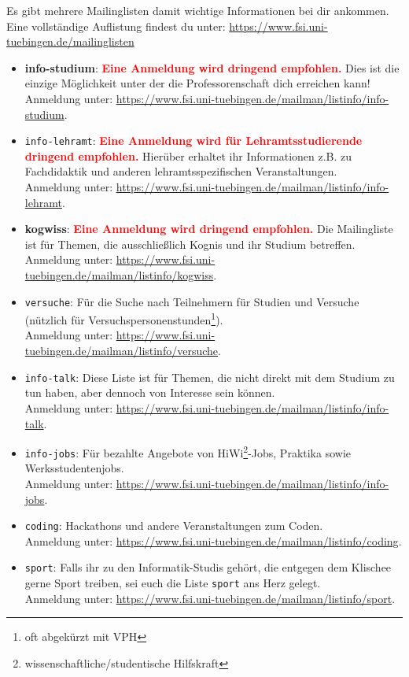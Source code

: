 Es gibt mehrere Mailinglisten damit wichtige Informationen bei dir ankommen.\\
Eine vollständige Auflistung findest du unter: \url{https://www.fsi.uni-tuebingen.de/mailinglisten}
\begin{itemize}
\item \textbf{info-studium}: \textcolor{red}{\textbf{Eine Anmeldung wird dringend empfohlen.}} Dies ist die einzige Möglichkeit unter der die Professorenschaft dich erreichen kann! \\
Anmeldung unter: \url{https://www.fsi.uni-tuebingen.de/mailman/listinfo/info-studium}.
\iflehramt
\item \texttt{info-lehramt}: \textcolor{red}{\textbf{Eine Anmeldung wird für Lehramtsstudierende dringend empfohlen.}} Hierüber erhaltet ihr Informationen z.B. zu Fachdidaktik und anderen lehramtsspezifischen Veranstaltungen.\\
Anmeldung unter: \url{https://www.fsi.uni-tuebingen.de/mailman/listinfo/info-lehramt}.
\fi
\ifkogwiss
\item \textbf{kogwiss}: \textcolor{red}{\textbf{Eine Anmeldung wird dringend empfohlen.}} Die Mailingliste ist für Themen, die ausschließlich Kognis und ihr Studium betreffen. \\
Anmeldung unter: \url{https://www.fsi.uni-tuebingen.de/mailman/listinfo/kogwiss}.

\item \texttt{versuche}: Für die Suche nach Teilnehmern für Studien und Versuche (nützlich für Versuchspersonenstunden\footnote{oft abgekürzt mit VPH}).\\
Anmeldung unter: \url{https://www.fsi.uni-tuebingen.de/mailman/listinfo/versuche}.
\fi
\item \texttt{info-talk}: Diese Liste ist für Themen, die nicht direkt mit dem Studium zu tun haben, aber dennoch von Interesse sein können.\\
Anmeldung unter: \url{https://www.fsi.uni-tuebingen.de/mailman/listinfo/info-talk}.
\item \texttt{info-jobs}: Für bezahlte Angebote von HiWi\footnote{wissenschaftliche/studentische Hilfskraft}-Jobs, Praktika sowie  Werksstudentenjobs.\\
Anmeldung unter: \url{https://www.fsi.uni-tuebingen.de/mailman/listinfo/info-jobs}.
\item \texttt{coding}: Hackathons und andere Veranstaltungen zum Coden.\\
Anmeldung unter: \url{https://www.fsi.uni-tuebingen.de/mailman/listinfo/coding}.
\item \texttt{sport}: Falls ihr zu den Informatik-Studis gehört, die entgegen dem Klischee gerne Sport treiben, sei euch die Liste \texttt{sport} ans Herz gelegt.\\
Anmeldung unter: \url{https://www.fsi.uni-tuebingen.de/mailman/listinfo/sport}.
\end{itemize}
